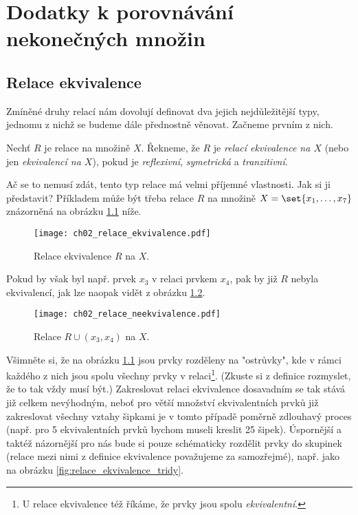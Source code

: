 \chapter{Dodatky k porovnávání nekonečných množin}\label{chap:dodatky_k_porovnavani_nekonecnych_mn}
\section{Relace ekvivalence}\label{sec:relace_ekvivalence}
Zmíněné druhy relací nám dovolují definovat dva jejich nejdůležitější typy, jednomu z nichž se budeme dále přednostně věnovat. Začneme prvním z nich.
\begin{definition}\label{def:relace_ekvivalence}
    Nechť $R$ je relace na množině $X$. Řekneme, že $R$ je \emph{relací ekvivalence na $X$} (nebo jen \emph{ekvivalencí na $X$}), pokud je \emph{reflexivní}, \emph{symetrická} a \emph{tranzitivní}.
\end{definition}
Ač se to nemusí zdát, tento typ relace má velmi příjemné vlastnosti. Jak si ji představit? Příkladem může být třeba relace $R$ na množině $X=\set{x_1,\dots,x_7}$ znázorněná na obrázku \ref{fig:priklad_relace_ekvivalence} níže.
\begin{figure}[H]
    \centering
    \texttt{[image: ch02\_relace\_ekvivalence.pdf]}
    \caption{Relace ekvivalence $R$ na $X$.}
    \label{fig:priklad_relace_ekvivalence}
\end{figure}
Pokud by však byl např. prvek $x_3$ v relaci prvkem $x_4$, pak by již $R$ nebyla ekvivalencí, jak lze naopak vidět z obrázku \ref{fig:priklad_relace_neekvivalence}.
\begin{figure}[H]
    \centering
    \texttt{[image: ch02\_relace\_neekvivalence.pdf]}
    \caption{Relace $R \cup (x_3,x_4)$ na $X$.}
    \label{fig:priklad_relace_neekvivalence}
\end{figure}
Všimněte si, že na obrázku \ref{fig:priklad_relace_ekvivalence} jsou prvky rozděleny na "ostrůvky", kde v rámci každého z nich jsou spolu všechny prvky v relaci\footnote{U relace ekvivalence též říkáme, že prvky jsou spolu \emph{ekvivalentní}.}. (Zkuste si z definice rozmyslet, že to tak vždy musí být.) Zakreslovat relaci ekvivalence dosavadním se tak stává již celkem nevýhodným, neboť pro větší množství ekvivalentních prvků již zakreslovat všechny vztahy šipkami je v tomto případě poměrně zdlouhavý proces (např. pro 5 ekvivalentních prvků bychom museli kreslit 25 šipek). Úspornější a taktéž názornější pro nás bude si pouze schématicky rozdělit prvky do skupinek (relace mezi nimi z definice ekvivalence považujeme za samozřejmé), např. jako na obrázku \ref{fig:relace_ekvivalence_tridy}.
